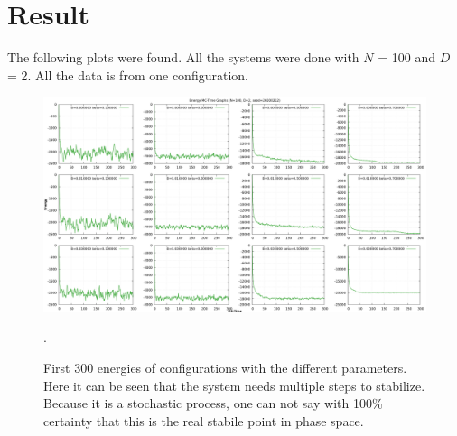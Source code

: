 \documentclass[11pt,a4paper]{article}
\begin{document}
\section{Result}

The following plots were found. All the systems were done with $N$ = 100 and $D$ = 2. All the data is from one configuration.

\begin{figure}
\centering
\includegraphics[scale=0.35]{all_energy_f300.png}
\caption{First 300 energies of configurations with the different parameters. Here it can be seen that the system needs multiple steps to stabilize. Because it is a stochastic process, one can not say with 100\% certainty that this is the real stabile point in phase space.}.
\label{fig:foo}
\end{figure}
\end{document}

